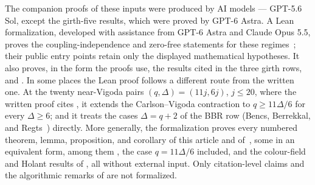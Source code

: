 \documentclass[11pt,reqno]{article}
\theoremstyle{plain}
\theoremstyle{definition}
\theoremstyle{remark}
\theoremstyle{definition}
\theoremstyle{remark}
\newcommand{\Deg}{\Delta}                        %
\begin{document}
The companion proofs of these inputs were produced by AI models ---
GPT-5.6 Sol, except the girth-five results, which were proved by GPT-6
Astra.  A Lean formalization, developed with assistance from GPT-6
Astra and Claude Opus 5.5, proves the
coupling-independence and zero-free statements for these regimes~\cite{Shi2026Formalization};
their public entry points retain only the displayed mathematical hypotheses.
It also proves, in the form the proofs use, the results cited in the
three girth rows, \cite[Lemmas~5.13 and~8.7 and Equation~(10)]{CLMM2023}
and \cite[Proposition~2.6(i) and Theorem~2.5]{BencsBerrekkalRegts2025Trees}.
In some places the Lean proof follows a different route from the written
one.  At the twenty near-Vigoda pairs \((q,\Deg)=(11j,6j)\), \(j\le20\),
where the written proof cites \cite[Theorem~20]{CFFGZZ2024}, it extends
the Carlson--Vigoda contraction to \(q\ge11\Deg/6\) for every
\(\Deg\ge6\); and it treats the cases \(\Deg=q+2\) of the BBR row
(Bencs, Berrekkal, and Regts~\cite{BencsBerrekkalRegts2025Trees})
directly.  More generally, the formalization proves every numbered
theorem, lemma, proposition, and corollary of this article and
of~\cite{ShaoShi2026FurtherPotts}, some in an equivalent form, among them
, the case \(q=11\Deg/6\)
included, and the colour-field and Holant results of
, all without external input.
Only citation-level claims and the algorithmic remarks of
 are not formalized.
\end{document}
